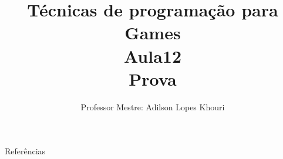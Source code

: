 \documentclass[compress, hyperref={pdfpagelayout=SinglePage}]{beamer}
\title[AED - Aula 12]{Técnicas de programação para Games \\ Aula12 \\ Prova}
\author{Professor Mestre: Adilson Lopes Khouri}
\begin{document}
	\begin{frame}
		\titlepage
	\end{frame}
	
	
	
	
	
	
	
	

	

	\begin{frame}[allowframebreaks]{Referências}
			\tiny
			\nocite{*}
			
	    		
	\end{frame}
\end{document}
